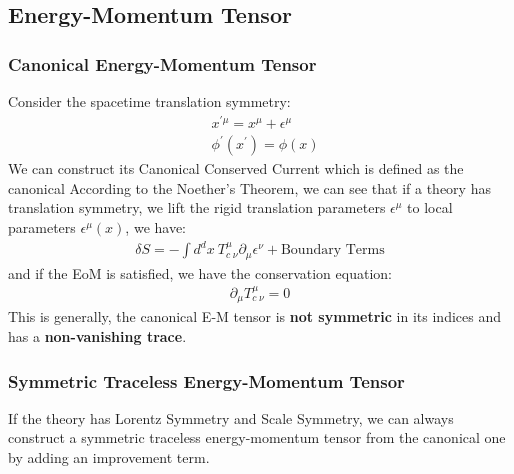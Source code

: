 \subsection{Energy-Momentum Tensor}

\subsubsection{Canonical Energy-Momentum Tensor}

Consider the spacetime translation symmetry:
\begin{align}
  &x^{\prime\mu}=x^\mu + \epsilon^\mu\\
  &\phi^{\prime}(x^{\prime})=\phi(x)
\end{align}
We can construct its Canonical Conserved Current which is defined as
the canonical
According to the Noether's Theorem, we can see that if a theory has
translation symmetry, we lift the rigid translation parameters $
\epsilon^\mu $ to local parameters $ \epsilon^\mu(x) $, we have:
\begin{align}
  \delta S = -\int d^dx\ T_c^\mu{}_\nu \partial_\mu \epsilon^\nu +
  \text{Boundary Terms}
\end{align}
and if the EoM is satisfied, we have the conservation equation:
\begin{align}
  \partial_\mu T_c^\mu{}_\nu =0
\end{align}
This is generally, the canonical E-M tensor is \textbf{not symmetric}
in its indices and has a \textbf{non-vanishing trace}.

\subsubsection{Symmetric Traceless Energy-Momentum Tensor}

If the theory has Lorentz Symmetry and Scale Symmetry, we can always
construct a symmetric traceless energy-momentum tensor from the
canonical one by adding an improvement term.

